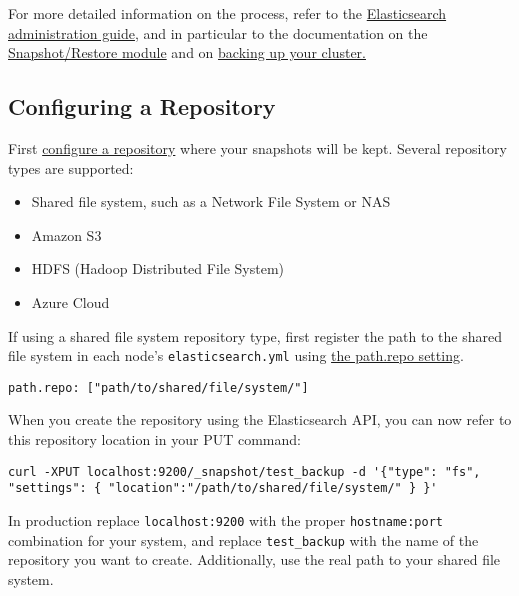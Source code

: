 For more detailed information on the process, refer to the
\href{https://www.elastic.co/guide/en/elasticsearch/guide/current/administration.html}{Elasticsearch
administration guide}, and in particular to the documentation on the
\href{https://www.elastic.co/guide/en/elasticsearch/reference/2.4/modules-snapshots.html}{Snapshot/Restore
module} and on
\href{https://www.elastic.co/guide/en/elasticsearch/guide/current/backing-up-your-cluster.html\#_snapshotting_particular_indices}{backing
up your cluster.}

\subsection{Configuring a Repository}\label{configuring-a-repository}

First
\href{https://www.elastic.co/guide/en/elasticsearch/guide/current/backing-up-your-cluster.html\#_creating_the_repository}{configure
a repository} where your snapshots will be kept. Several repository
types are supported:

\begin{itemize}
\tightlist
\item
  Shared file system, such as a Network File System or NAS
\item
  Amazon S3
\item
  HDFS (Hadoop Distributed File System)
\item
  Azure Cloud
\end{itemize}

If using a shared file system repository type, first register the path
to the shared file system in each node's \texttt{elasticsearch.yml}
using
\href{https://www.elastic.co/guide/en/elasticsearch/reference/2.4/modules-snapshots.html\#_shared_file_system_repository}{the
path.repo setting}.

\begin{verbatim}
path.repo: ["path/to/shared/file/system/"]
\end{verbatim}

When you create the repository using the Elasticsearch API, you can now
refer to this repository location in your PUT command:

\begin{verbatim}
curl -XPUT localhost:9200/_snapshot/test_backup -d '{"type": "fs", "settings": { "location":"/path/to/shared/file/system/" } }'
\end{verbatim}

In production replace \texttt{localhost:9200} with the proper
\texttt{hostname:port} combination for your system, and replace
\texttt{test\_backup} with the name of the repository you want to
create. Additionally, use the real path to your shared file system.

